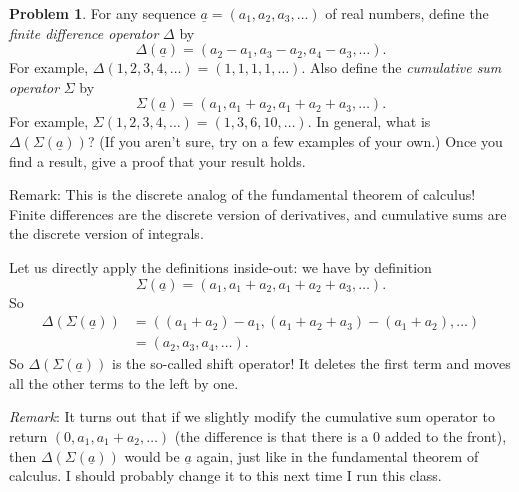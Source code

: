 \documentclass[11pt,oneside]{amsart}
\theoremstyle{definition}
\newtheorem{problem}{Problem}
\begin{document}
    \begin{problem}
        For any sequence $\underline a=(a_1,a_2,a_3,\dots)$ of real numbers, define the \emph{finite difference operator} $\Delta$ by 
        \[\Delta(\underline a)=(a_2-a_1,a_3-a_2,a_4-a_3,\dots).\]
        For example, $\Delta(1,2,3,4,\dots)=(1,1,1,1,\dots)$. Also define the \emph{cumulative sum operator} $\Sigma$ by
        \[\Sigma(\underline a)=(a_1,a_1+a_2,a_1+a_2+a_3,\dots).\]
        For example, $\Sigma(1,2,3,4,\dots)=(1,3,6,10,\dots)$. In general, what is $\Delta(\Sigma(\underline a))$? (If you aren't sure, try on a few examples of your own.) Once you find a result, give a proof that your result holds.

        Remark: This is the discrete analog of the fundamental theorem of calculus! Finite differences are the discrete version of derivatives, and cumulative sums are the discrete version of integrals.
    \end{problem}
    \begin{solution}
        Let us directly apply the definitions inside-out: we have by definition
        \[\Sigma(\underline a)=(a_1,a_1+a_2,a_1+a_2+a_3,\dots).\]
        So
        \begin{align*}
            \Delta(\Sigma(\underline a)) &= ((a_1+a_2)-a_1, (a_1+a_2+a_3)-(a_1+a_2),\dots)\\
            &= (a_2,a_3,a_4,\dots).
        \end{align*}
        So $\Delta(\Sigma(\underline a))$ is the so-called shift operator! It deletes the first term and moves all the other terms to the left by one.

        \emph{Remark}: It turns out that if we slightly modify the cumulative sum operator to return $(0,a_1,a_1+a_2,\dots)$ (the difference is that there is a 0 added to the front), then $\Delta(\Sigma(\underline a))$ would be $\underline a$ again, just like in the fundamental theorem of calculus. I should probably change it to this next time I run this class.
    \end{solution}
\end{document}
